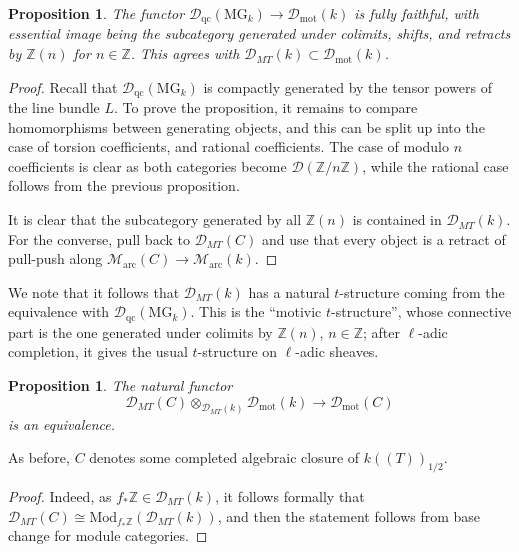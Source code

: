 \documentclass[11pt]{amsart}
\numberwithin{equation}{section}
\numberwithin{theorem}{section}
\newtheorem{proposition}[theorem]{Proposition}
\theoremstyle{definition}
\begin{document}
\begin{proposition}\label{prop:tatemotives} The functor $\mathcal D_{\mathrm{qc}}(\mathrm{MG}_k)\to \mathcal D_{\mathrm{mot}}(k)$ is fully faithful, with essential image being the subcategory generated under colimits, shifts, and retracts by $\mathbb Z(n)$ for $n\in \mathbb Z$. This agrees with $\mathcal D_{MT}(k)\subset \mathcal D_{\mathrm{mot}}(k)$.
\end{proposition}

\begin{proof} Recall that $\mathcal D_{\mathrm{qc}}(\mathrm{MG}_k)$ is compactly generated by the tensor powers of the line bundle $L$. To prove the proposition, it remains to compare homomorphisms between generating objects, and this can be split up into the case of torsion coefficients, and rational coefficients. The case of modulo $n$ coefficients is clear as both categories become $\mathcal D(\mathbb Z/n\mathbb Z)$, while the rational case follows from the previous proposition.

It is clear that the subcategory generated by all $\mathbb Z(n)$ is contained in $\mathcal D_{MT}(k)$. For the converse, pull back to $\mathcal D_{MT}(C)$ and use that every object is a retract of pull-push along $\mathcal M_{\mathrm{arc}}(C)\to \mathcal M_{\mathrm{arc}}(k)$.
\end{proof}

We note that it follows that $\mathcal D_{MT}(k)$ has a natural $t$-structure coming from the equivalence with $\mathcal D_{\mathrm{qc}}(\mathrm{MG}_k)$. This is the ``motivic $t$-structure'', whose connective part is the one generated under colimits by $\mathbb Z(n)$, $n\in \mathbb Z$; after $\ell$-adic completion, it gives the usual $t$-structure on $\ell$-adic sheaves.

\begin{proposition} The natural functor
\[
\mathcal D_{MT}(C)\otimes_{\mathcal D_{MT}(k)} \mathcal D_{\mathrm{mot}}(k)\to \mathcal D_{\mathrm{mot}}(C)
\]
is an equivalence.
\end{proposition}

As before, $C$ denotes some completed algebraic closure of $k((T))_{1/2}$.

\begin{proof} Indeed, as $f_\ast \mathbb Z\in \mathcal D_{MT}(k)$, it follows formally that $\mathcal D_{MT}(C)\cong \mathrm{Mod}_{f_\ast \mathbb Z}(\mathcal D_{MT}(k))$, and then the statement follows from base change for module categories.
\end{proof}
\end{document}
